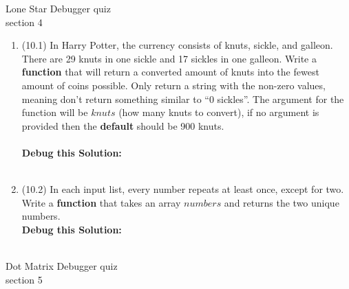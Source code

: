 \documentclass{article}
\begin{document}

Lone Star \hfill Debugger quiz\\
section 4\\
\begin{enumerate}
\item (10.1) 
		In Harry Potter, the currency consists of knuts, sickle, and galleon. There are 29 knuts in 
		one sickle and 17 sickles in one galleon. Write a \textbf{function} that will return a 
		converted amount of knuts into the fewest amount of coins possible. Only return a string 
		with the non-zero values, meaning don't return something similar to ``0 sickles''. The 
		argument for the function will be $knuts$ (how many knuts to convert), if no argument is 
		provided then the \textbf{default} should be 900 knuts. \\ \\
		\textbf{Debug this Solution:}\\
		\mbox{ \hspace*{0.25in}	}

\pagebreak



\item (10.2) 	
		In each input list, every number repeats at least once, except for two. Write a \textbf{function} 
		that takes an array $numbers$ and returns the two unique numbers.\\

		\textbf{Debug this Solution:}\\
		\mbox{ \hspace*{0.25in}	}

\pagebreak



\end{enumerate}
\pagebreak
Dot Matrix \hfill Debugger quiz\\
section 5\\
\end{document}
